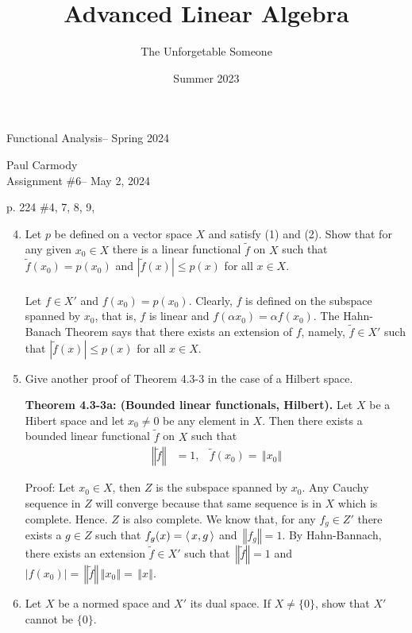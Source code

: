 \documentclass[10pt,a4paper]{report}
\title{Advanced Linear Algebra}
\author{The Unforgetable Someone}
\date{Summer 2023}
\newcommand{\CLASSNAME}{Functional Analysis}
\newcommand{\STUDENTNAME}{Paul Carmody}
\newcommand{\ASSIGNMENT}{Assignment \#6}
\newcommand{\DUEDATE}{May 2, 2024}
\newcommand{\SEMESTER}{Spring 2024}
\newcommand{\NORM}[1]{\,\left \Vert #1 \right \Vert}
\begin{document}
\begin{center}
	\Large{\CLASSNAME -- \SEMESTER} \\
\end{center}
\begin{center}
	\STUDENTNAME \\
	\ASSIGNMENT -- \DUEDATE\\
\end{center} 


p. 224 \#4, 7, 8, 9, 

\begin{enumerate}
	\setcounter{enumi}{3}
	\item Let $p$ be defined on a vector space $X$ and satisfy (1) and (2). Show that for any given $x_0 \in X$ there is a linear functional $\tilde{f}$ on $X$ such that $\tilde{f}(x_0)=p(x_0)$ and $|\tilde{f}(x)| \le p(x)$ for all $x \in X$.\\
	\\
	Let $f \in X'$ and $f(x_0)=p(x_0)$.  Clearly, $f$ is defined on the subspace spanned by $x_0$, that is, $f$ is linear and $f(\alpha x_0)=\alpha f(x_0)$.  The Hahn-Banach Theorem says that there exists an extension of $f$, namely, $\tilde{f} \in X'$ such that $|\tilde{f}(x)| \le p(x)$ for all $x \in X$.
	
	\setcounter{enumi}{6}
	\item Give another proof of Theorem 4.3-3 in the case of a Hilbert space.
	
	\textbf{Theorem 4.3-3a: (Bounded linear functionals, Hilbert).}  Let $X$ be a Hibert space and let $x_0\ne 0$ be any element in $X$.  Then there exists a bounded linear functional $\tilde{f}$ on $X$ such that 
	\begin{align*}
	\NORM{\tilde{f}} &= 1, &\tilde{f}(x_0)= \NORM{x_0}
	\end{align*}
	
	Proof: Let $x_0 \in X$, then $Z$ is the subspace spanned by $x_0$. Any Cauchy sequence in $Z$ will converge because that same sequence is in $X$ which is complete.  Hence. $Z$ is also complete.  We know that, for any $f_g \in Z'$ there exists a $g \in Z$ such that $f_g(x) = \left \langle\, x,g \,\right \rangle$ and $\NORM{f_g} = 1$.  By Hahn-Bannach, there exists an extension $\tilde{f} \in X'$ such that $\NORM{\tilde{f}} = 1$ and $|f(x_0)| = \NORM{\tilde{f}} \NORM{x_0} = \NORM{x}$.
	
	\item Let $X$ be a normed space and $X'$ its dual space. If $X \ne \{0\}$, show that $X'$ cannot be $\{0\}$.
	

\end{enumerate}
\end{document}

